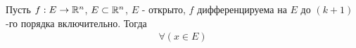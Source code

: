 \begin{teorema}
Пусть $f:E\to\mathbb{R}^n$, $E\subset\mathbb{R}^n$, $E$ - открыто, $f$ дифференцируема на $E$ до $(k+1)$-го порядка включительно.
Тогда
\begin{multline}
\forall(x\in E)
\end{multline}
\end{teorema}
\dokvo
\dokno
